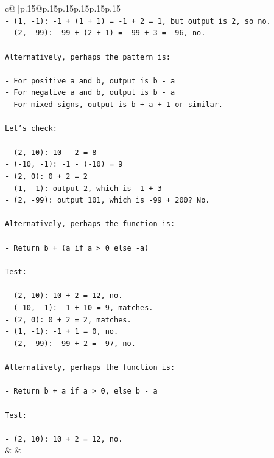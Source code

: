 \documentclass{article}
\begin{document}
{\begin{supertabular}{c@{$\;$}|p{.15\linewidth}@{}p{.15\linewidth}p{.15\linewidth}p{.15\linewidth}p{.15\linewidth}p{.15\linewidth}}
{{{\\ 
\texttt{{-} (1, {-}1): {-}1 + (1 + 1) = {-}1 + 2 = 1, but output is 2, so no.} \\
\texttt{{-} (2, {-}99): {-}99 + (2 + 1) = {-}99 + 3 = {-}96, no.} \\
\\ 
\texttt{Alternatively, perhaps the pattern is:} \\
\\ 
\texttt{{-} For positive a and b, output is b {-} a} \\
\texttt{{-} For negative a and b, output is b {-} a} \\
\texttt{{-} For mixed signs, output is b + a + 1 or similar.} \\
\\ 
\texttt{Let's check:} \\
\\ 
\texttt{{-} (2, 10): 10 {-} 2 = 8} \\
\texttt{{-} ({-}10, {-}1): {-}1 {-} ({-}10) = 9} \\
\texttt{{-} (2, 0): 0 + 2 = 2} \\
\texttt{{-} (1, {-}1): output 2, which is {-}1 + 3} \\
\texttt{{-} (2, {-}99): output 101, which is {-}99 + 200? No.} \\
\\ 
\texttt{Alternatively, perhaps the function is:} \\
\\ 
\texttt{{-} Return b + (a if a > 0 else {-}a)} \\
\\ 
\texttt{Test:} \\
\\ 
\texttt{{-} (2, 10): 10 + 2 = 12, no.} \\
\texttt{{-} ({-}10, {-}1): {-}1 + 10 = 9, matches.} \\
\texttt{{-} (2, 0): 0 + 2 = 2, matches.} \\
\texttt{{-} (1, {-}1): {-}1 + 1 = 0, no.} \\
\texttt{{-} (2, {-}99): {-}99 + 2 = {-}97, no.} \\
\\ 
\texttt{Alternatively, perhaps the function is:} \\
\\ 
\texttt{{-} Return b + a if a > 0, else b {-} a} \\
\\ 
\texttt{Test:} \\
\\ 
\texttt{{-} (2, 10): 10 + 2 = 12, no.} \\
            }
        }
    }
    & & \\ \\


\end{supertabular}}
\end{document}
